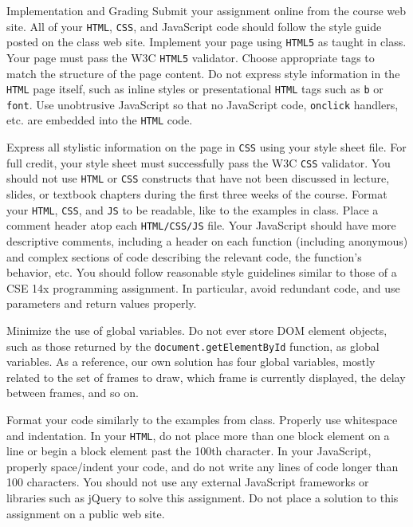\documentclass[programming]{../../mfcs}
\begin{document}
\begin{question}{Implementation and Grading}
  Submit your assignment online from the course web site. All of your \texttt{HTML}, \texttt{CSS}, and JavaScript code should
follow the style guide posted on the class web site.
Implement your page using \texttt{HTML5} as taught in class. Your page must pass the W3C \texttt{HTML5} validator. Choose appropriate tags 
to match the structure of the page content. Do not express style information in the \texttt{HTML} page itself, such as inline styles or presentational \texttt{HTML} tags such as \texttt{b} or
  \texttt{font}. Use unobtrusive JavaScript so that no
JavaScript code, \texttt{onclick} handlers, etc. are embedded into the \texttt{HTML} code.
\newline

Express all stylistic information on the page in \texttt{CSS} using your style sheet file. For full credit, your style sheet must
successfully pass the W3C \texttt{CSS} validator. You should not use \texttt{HTML} or \texttt{CSS} constructs that have not been
discussed in lecture, slides, or textbook chapters during the first three weeks of the course.
  Format your \texttt{HTML}, \texttt{CSS}, and \texttt{JS} to be readable, like to the examples in class. Place a comment header atop each
\texttt{HTML/CSS/JS} file. Your JavaScript should have more descriptive comments, including a header on each function
(including anonymous) and complex sections of code describing the relevant code, the function's behavior, etc.
You should follow reasonable style guidelines similar to those of a CSE 14x programming assignment. In particular,
avoid redundant code, and use parameters and return values properly.
\newline

Minimize the use of global variables. Do not ever store DOM element objects, such as those returned by the
  \texttt{document.getElementById} function, as global variables. As a reference, our own solution has four global
variables, mostly related to the set of frames to draw, which frame is currently displayed, the delay between frames,
and so on.
\newline

Format your code similarly to the examples from class. Properly use whitespace and indentation. In your \texttt{HTML},
do not place more than one block element on a line or begin a block element past the 100th character. In your
JavaScript, properly space/indent your code, and do not write any lines of code longer than 100 characters.
You should not use any external JavaScript frameworks or libraries such as jQuery to solve this assignment.
Do not place a solution to this assignment on a public web site.
\end{question}
\end{document}
